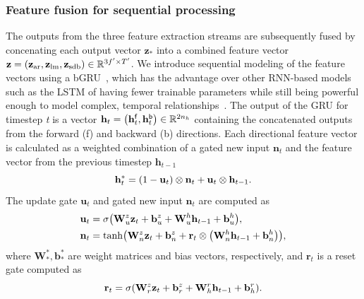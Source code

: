 \subsubsection{Feature fusion for sequential processing}
The outputs from the three feature extraction streams are subsequently fused by concenating each output vector \( \mathbf{z}_{\ast} \) into a combined feature vector \(\mathbf{z}=\parentheses*{\mathbf{z}_\text{ar}, \mathbf{z}_\text{lm}, \mathbf{z}_\text{sdb}} \in \R{3f^{\prime} \times T^{\prime}}\).
We introduce sequential modeling of the feature vectors using a \ac{bGRU}~\cite{Cho2014}, which has the advantage over other \ac{RNN}-based models such as the \ac{LSTM} of having fewer trainable parameters while still being powerful enough to model complex, temporal relationships~\cite{Chung2014}.
The output of the \ac{GRU} for timestep \textit{t} is a vector \( \mathbf{h}_{t} = \parentheses*{{\mathbf{h}_{t}^{\mathsf{f}}}, {\mathbf{h}_{t}^{\mathsf{b}}}} \in \R{2n_h}\) containing the concatenated outputs from the forward (\textsf{f}) and backward (\textsf{b}) directions.
Each directional feature vector is calculated as a weighted combination of a gated new input \(\mathbf{n}_t\) and the feature vector from the previous timestep \(\mathbf{h}_{t-1}\)
\begin{equation}
    \mathbf{h}^{\ast}_t = \parentheses*{1 - \mathbf{u}_t} \otimes \mathbf{n}_t + \mathbf{u}_t \otimes \mathbf{h}_{t-1}.
\end{equation}
The update gate \(\mathbf{u}_t\) and gated new input \(\mathbf{n}_t\) are computed as
\begin{align}
    \mathbf{u}_t &= \func{\sigma}{\mathbf{W}_{u}^z \mathbf{z}_t + \mathbf{b}_u^z + \mathbf{W}_{u}^h \mathbf{h}_{t-1} + \mathbf{b}_u^h}, \\
    \mathbf{n}_t &= \func{\tanh}{\mathbf{W}_{n}^z \mathbf{z}_t + \mathbf{b}_n^z + \mathbf{r}_t \otimes \parentheses*{ \mathbf{W}_{n}^h \mathbf{h}_{t-1} + \mathbf{b}_n^h }},
\end{align}
where \(\mathbf{W}^\ast_\ast, \mathbf{b}^\ast_\ast\) are weight matrices and bias vectors, respectively, and \(\mathbf{r}_t\) is a reset gate computed as
\begin{equation}
    \mathbf{r}_t = \func{\sigma}{\mathbf{W}_r^z \mathbf{z}_t + \mathbf{b}_r^z + \mathbf{W}_h^r \mathbf{h}_{t-1} + \mathbf{b}_h^r}.
\end{equation}

